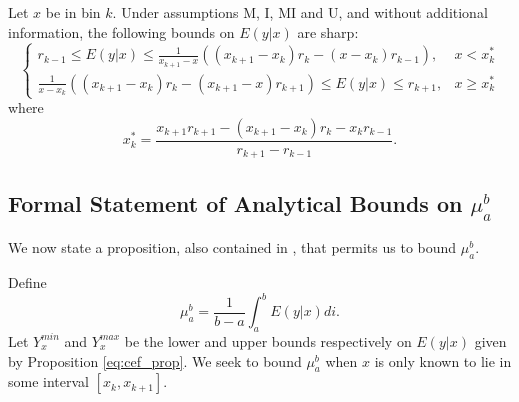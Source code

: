 \begin{nono-prop} 
  \nonumber
  \label{eq:cef_prop}
  Let $x$ be in bin $k$. Under assumptions M, I, MI \cite{manski2002} and
  U, and without additional information, the
  following bounds on $E(y \vert x)$ are sharp:
  $$
  \begin{cases}                                                                                                                          %
    r_{k-1} \leq E(y \vert x) \leq \frac{1}{x_{k+1} - x} \left(
    \left(x_{k+1} - x_k\right) r_k - \left(x - x_k\right) r_{k-1} \right), & x < x_k^* \\                                                                %
    \frac{1}{x - x_k} \left( \left(x_{k+1} - x_k\right) r_k -
    \left(x_{k+1} - x\right) r_{k+1} \right) \leq E(y \vert x) \leq r_{k+1}, & x \geq x_k^*                                                                                                                 %
  \end{cases}
  $$
  where $$x_k^* = \frac{x_{k+1} r_{k+1}
    - \left(x_{k+1} - x_k\right) r_k -
    x_k r_{k-1}  }{r_{k+1} - r_{k-1} }.$$  %
\end{nono-prop} 

\subsection{Formal Statement of Analytical Bounds on $\mu_a^b$} 
\label{app:mu_prop} 
We now state a proposition, also contained in
, that permits us to bound $\mu_a^b$. 

Define $$  \mu_a^{b} = \frac{1}{b - a} \int_a^{b} E(y | x) di. $$ Let
$Y_x^{min}$ and $Y_x^{max}$ be the lower and upper bounds respectively
on $E(y | x)$ given by Proposition \ref{eq:cef_prop}. 
We seek to bound $\mu_a^b$ when $x$ is only known to lie in some
interval $[x_k, x_{k+1}]$. 

